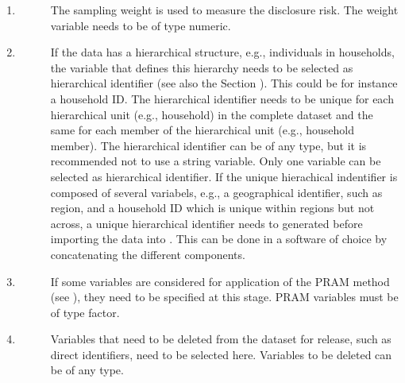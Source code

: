 \documentclass[letterpaper,10pt,english]{sphinxmanual}
\begin{document}
\begin{enumerate}
\begin{description}
\end{description}

\item {} \begin{description}
\item[{}] \leavevmode
The sampling weight is used to measure the disclosure risk. The weight
variable needs to be of type numeric.

\end{description}

\item {} \begin{description}
\item[{}] \leavevmode
If the data has a hierarchical structure, e.g., individuals
in households, the variable that defines this hierarchy needs to be selected as
hierarchical identifier (see also the Section ). This could be for instance a household ID. The hierarchical
identifier needs to be unique for each hierarchical unit (e.g., household)
in the complete dataset and the same for each
member of the hierarchical unit (e.g., household member).
The hierarchical identifier can be of any type, but it is recommended not to use a string
variable. Only one variable can be selected as hierarchical identifier.
If the unique hierachical indentifier is
composed of several variabels, e.g., a geographical identifier, such as region, and
a household ID which is unique within regions but not across, a unique hierarchical
identifier needs to generated before importing the data into . This can be done in
a software of choice by concatenating the different components.

\end{description}

\item {} \begin{description}
\item[{}] \leavevmode
If some variables are considered for application of the PRAM method (see ),
they need to be specified at this stage. PRAM variables must be of type factor.

\end{description}

\item {} \begin{description}
\item[{}] \leavevmode
Variables that need to be deleted from the dataset for release, such as
direct identifiers, need to be selected here. Variables to be deleted can be of any type.


\end{description}
\end{enumerate}
\end{document}
